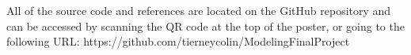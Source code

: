 \documentclass[25pt, a0paper, portrait]{tikzposter}
\begin{document}
{
    \vspace{.5cm}
    All of the source code and references are located on the GitHub repository and can be accessed 
    by scanning the QR code at the top of the poster, or going to the following URL: 
    https://github.com/tierneycolin/ModelingFinalProject 
    \vspace{.5cm}
}
\end{document}
